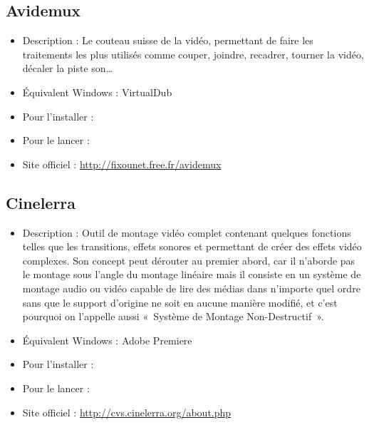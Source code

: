 \subsection{Avidemux}
\begin{itemize}
\begingroup
{}
\item Description : Le couteau suisse de la vidéo, permettant de faire les traitements les plus utilisés comme couper, joindre, recadrer, tourner la vidéo, décaler la piste son\ldots{}{\par}
\item Équivalent Windows : VirtualDub{\par}
\item Pour l'installer : 
\item Pour le lancer : 
\item Site officiel : \url{http://fixounet.free.fr/avidemux}{\par}
\endgroup
\end{itemize}
\subsection{Cinelerra}
\begin{itemize}
\begingroup
{}
\item Description : Outil de montage vidéo complet contenant quelques fonctions telles que les transitions, effets sonores et permettant de créer des effets vidéo complexes. Son concept peut dérouter au premier abord, car il n'aborde pas le montage sous l'angle du montage linéaire mais il consiste en un système de montage audio ou vidéo capable de lire des médias dans n'importe quel ordre sans que le support d'origine ne soit en aucune manière modifié, et c'est pourquoi on l'appelle aussi «~Système de Montage Non-Destructif~».{\par}
\endgroup
\item Équivalent Windows : Adobe Premiere{\par}
\item Pour l'installer : 
\item Pour le lancer : 
\item Site officiel : \url{http://cvs.cinelerra.org/about.php}{\par}
\end{itemize}
\newpage

